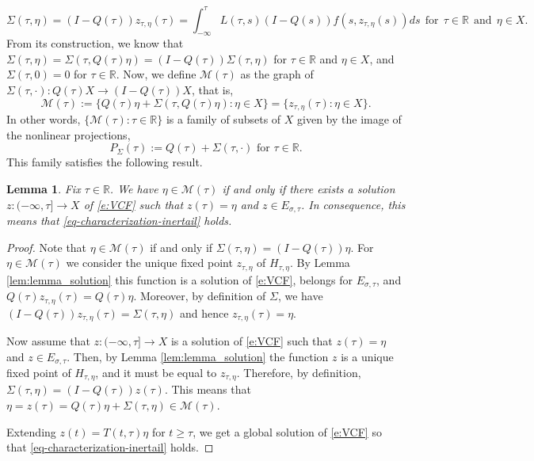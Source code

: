 \documentclass[a4paper,11pt,reqno]{amsart}
\theoremstyle{plain}
\newtheorem{lem}{Lemma}[section]
\theoremstyle{definition}
\numberwithin{equation}{section}
\newcommand{\R}{\mathbb{R}}
\newcommand{\calm}{\mathcal M}
\renewcommand{\geq}{\geqslant}
\renewcommand{\leq}{\leqslant}
\begin{document}
\begin{equation}\label{e:DEFNSIGMA}
\Sigma(\tau,\eta)=(I-Q(\tau))z_{\tau,\eta}(\tau)=\int_{-\infty}^{\tau}L(\tau,s)(I-Q(s))f(s,z_{\tau,\eta}(s))ds\ \ \text{for}\ \ \tau\in\R\ \ \text{and}\ \ \eta\in X.
\end{equation}
From its construction, we know that $\Sigma(\tau,\eta)=\Sigma(\tau,Q(\tau)\eta)=(I-Q(\tau))\Sigma(\tau,\eta)$ for $\tau\in\R$ and $\eta\in X$, and $\Sigma(\tau,0)=0$ for $\tau\in\R$.
Now, we define  
$\mathcal{M}(\tau)$ as the graph of $\Sigma(\tau,
\cdot):Q(\tau)X\to (I-Q(\tau))X$, that is, 
\begin{equation}\label{e:MANIFOLD}
\calm(\tau):=\{Q(\tau)\eta+\Sigma(\tau,Q(\tau)\eta)\colon \eta\in X\}=\{z_{\tau,\eta}(\tau)\colon\eta\in X\}.
\end{equation}
In other words, 
$\{\mathcal{M}(\tau)\colon \tau\in \R\}$
is a family of subsets of $X$ given by
the image of the nonlinear projections, 
\begin{equation}\label{eq-Def_P_Sigma}
    P_\Sigma(\tau):=Q(\tau)+\Sigma(\tau,\cdot) \text{ for } \tau
\in \R.
\end{equation}
This family satisfies the following result.
\begin{lem}\label{lem:characterization}
    Fix $\tau\in \R$. We have $\eta\in \mathcal{M}(\tau)$ if and only if there exists a solution  $z\colon(-\infty,\tau]\to X$ of \eqref{e:VCF} such that $z(\tau) = \eta$ and $z\in E_{\sigma,\tau}$. In consequence, this means that  \eqref{eq-characterization-inertail} holds.
\end{lem}


\begin{proof}
Note that $\eta\in \mathcal{M}(\tau)$ if and only if $\Sigma(\tau,\eta)=(I-Q(\tau))\eta$. For $\eta\in \mathcal{M}(\tau)$ we consider the unique fixed point $z_{\tau,\eta}$ of $H_{\tau,\eta}$. By Lemma \ref{lem:lemma_solution} this function is a solution of \eqref{e:VCF}, belongs for $E_{\sigma,\tau}$, and $Q(\tau)z_{\tau,\eta}(\tau) = Q(\tau)\eta$.  Moreover, by definition of $\Sigma$, we have $(I-Q(\tau))z_{\tau,\eta}(\tau) = \Sigma(\tau,\eta)$ and hence $z_{\tau,\eta}(\tau) =\eta$. 

Now assume that $z\colon(-\infty,\tau]\to X$ is a solution of \eqref{e:VCF} such that $z(\tau)=\eta$ and $z\in E_{\sigma,\tau}$. Then, by Lemma \ref{lem:lemma_solution} the function $z$ is a unique fixed point of 
$H_{\tau,\eta}$, and it must be equal to $z_{\tau,\eta}$. Therefore, by definition, $\Sigma(\tau,\eta) = (I-Q(\tau))z(\tau)$. This means that $\eta=z(\tau) = Q(\tau)\eta + \Sigma(\tau,\eta)\in \calm(\tau).$

Extending $z(t)=T(t,\tau)\eta$ for $t\geq \tau$, we get a global solution of \eqref{e:VCF} so that \eqref{eq-characterization-inertail} holds.
\end{proof}
\end{document}
